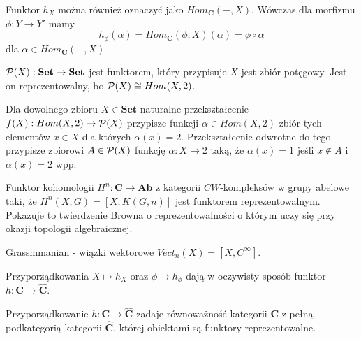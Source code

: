 Funktor $h_X$ można również oznaczyć jako $Hom_{\mathbf{C}}(-, X)$. Wówczas dla morfizmu $\phi:Y\to Y'$ mamy 
$$h_\phi(\alpha)=Hom_{\mathbf{C}}(\phi, X)(\alpha)=\phi\circ\alpha$$
dla $\alpha\in Hom_{\mathbf{C}}(-, X)$

\begin{example}
  \item $\mathcal{P}(X):\mathbf{Set}\to\mathbf{Set}$ jest funktorem, który przypisuje $X$ jest zbiór potęgowy. Jest on reprezentowalny, bo $\mathcal{P}(X)\cong Hom(X, 2)$.
    
    Dla dowolnego zbioru $X\in\mathbf{Set}$ naturalne przekształcenie $f(X):Hom(X, 2)\to \mathcal{P}(X)$ przypisze funkcji $\alpha\in Hom(X, 2)$ zbiór tych elementów $x\in X$ dla których $\alpha(x) = 2$. Przekształcenie odwrotne do tego przypisze zbiorowi $A\in\mathcal{P}(X)$ funkcję $\alpha:X\to 2$ taką, że $\alpha(x)=1$ jeśli $x\notin A$ i $\alpha(x)=2$ wpp.

  \item Funktor kohomologii $H^n:\mathbf{C}\to\mathbf{Ab}$ z kategorii $CW$-kompleksów w grupy abelowe taki, że $H^n(X,G)=[X,K(G, n)]$ jest funktorem reprezentowalnym. Pokazuje to twierdzenie Browna o reprezentowalności o którym uczy się przy okazji topologii algebraicznej.
  
  \item Grassmmanian - wiązki wektorowe $Vect_n(X)=[X, C^\infty]$.
\end{example}

Przyporządkowania $X\mapsto h_X$ oraz $\phi\mapsto h_\phi$ dają w oczywisty sposób funktor $h:\mathbf{C}\to\mathbf{\hat{C}}$.

\begin{lemma}
  Przyporządkowanie $h:\mathbf{C}\to\mathbf{\hat{C}}$ zadaje równoważność kategorii $\mathbf{C}$ z pełną podkategorią kategorii $\mathbf{\hat{C}}$, której obiektami są funktory reprezentowalne.
\end{lemma}

